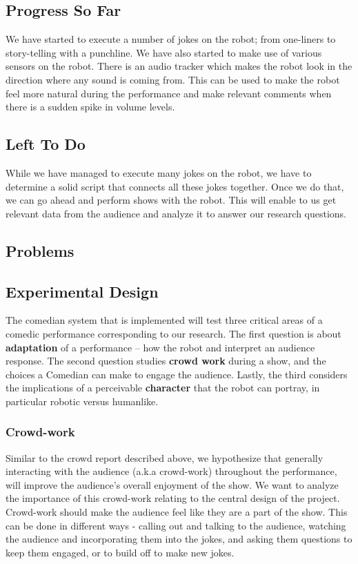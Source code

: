 \documentclass[onecolumn, draftclsnofoot,10pt, compsoc]{IEEEtran}
\begin{document}
\subsection{Progress So Far}

We have started to execute a number of jokes on the robot; from one-liners to story-telling with a punchline. We have also started to make use of various sensors on the robot. There is an audio tracker which makes the robot look in the direction where any sound is coming from. This can be used to make the robot feel more natural during the performance and make relevant comments when there is a sudden spike in volume levels. 

\subsection{Left To Do}

While we have managed to execute many jokes on the robot, we have to determine a solid script that connects all these jokes together. Once we do that, we can go ahead and perform shows with the robot. This will enable to us get relevant data from the audience and analyze it to answer our research questions. 

\subsection{Problems}

\subsection{Experimental Design}

The comedian system that is implemented will test three critical areas of a comedic performance corresponding to our research. The first question is about \textbf{adaptation} of a performance -- how the robot and interpret an audience response. The second question studies \textbf{crowd work} during a show, and the choices a Comedian can make to engage the audience. Lastly, the third considers the implications of a perceivable \textbf{character} that the robot can portray, in particular robotic versus humanlike.

\subsubsection{Crowd-work}

Similar to the crowd report described above, we hypothesize that generally interacting with the audience (a.k.a crowd-work) throughout the performance, will improve the audience's overall enjoyment of the show. We want to analyze the importance of this crowd-work relating to the central design of the project. 
Crowd-work should make the audience feel like they are a part of the show. This can be done in different ways - calling out and talking to the audience, watching the audience and incorporating them into the jokes, and asking them questions to keep them engaged, or to build off to make new jokes.
\end{document}
